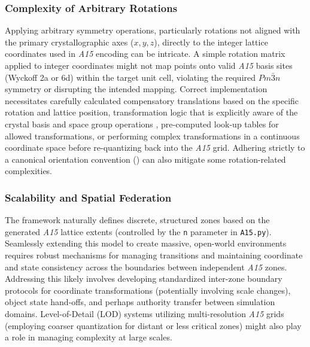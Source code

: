 \documentclass[10pt]{article}
\def\AAAB{\textit{A15}}
\begin{document}
\subsubsection{Complexity of Arbitrary Rotations}\label{subsubsec:limits-symmetry}
Applying arbitrary symmetry operations, particularly rotations not aligned with the primary crystallographic axes ($x,y,z$), directly to the integer lattice coordinates used in \AAAB{} encoding can be intricate. A simple rotation matrix applied to integer coordinates might not map points onto valid \AAAB{} basis sites (Wyckoff 2a or 6d) within the target unit cell, violating the required $Pm\bar{3}n$ symmetry or disrupting the intended mapping. Correct implementation necessitates carefully calculated compensatory translations based on the specific rotation and lattice position, transformation logic that is explicitly aware of the crystal basis and space group operations \cite{ITCVolumeA2016}, pre-computed look-up tables for allowed transformations, or performing complex transformations in a continuous coordinate space before re-quantizing back into the \AAAB{} grid. Adhering strictly to a canonical orientation convention () can also mitigate some rotation-related complexities.

\subsubsection{Scalability and Spatial Federation}\label{subsubsec:limits-federation}
The framework naturally defines discrete, structured zones based on the generated \AAAB{} lattice extents (controlled by the \texttt{n} parameter in \texttt{A15.py}). Seamlessly extending this model to create massive, open-world environments requires robust mechanisms for managing transitions and maintaining coordinate and state consistency across the boundaries between independent \AAAB{} zones. Addressing this likely involves developing standardized inter-zone boundary protocols for coordinate transformations (potentially involving scale changes), object state hand-offs, and perhaps authority transfer between simulation domains. Level-of-Detail (LOD) systems \cite{Luebke2002} utilizing multi-resolution \AAAB{} grids (employing coarser quantization for distant or less critical zones) might also play a role in managing complexity at large scales.
\end{document}
